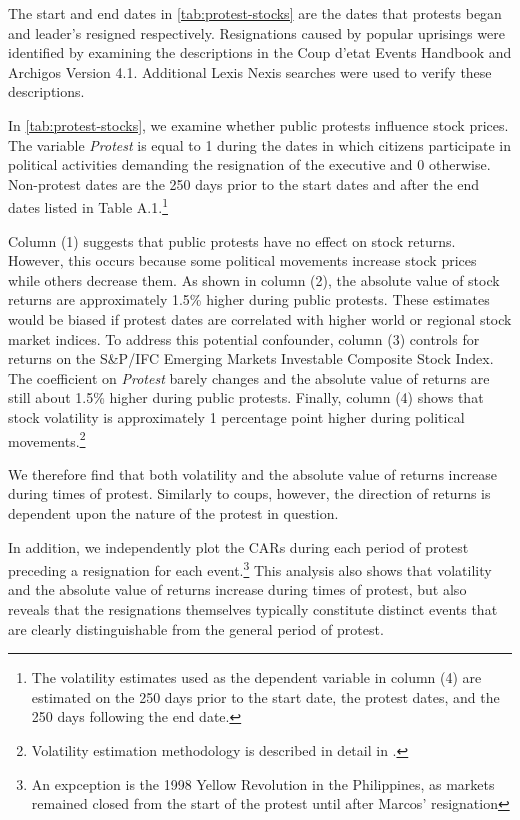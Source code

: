 \documentclass[12pt,final,fleqn]{article}
\theoremstyle{plain}
\begin{document}
The start and end dates in \autoref{tab:protest-stocks} are the dates that protests began and leader's resigned respectively. Resignations caused by popular uprisings were identified by examining the descriptions in the Coup d'etat Events Handbook and Archigos Version 4.1. Additional Lexis Nexis searches were used to verify these descriptions.

In \autoref{tab:protest-stocks}, we examine whether public protests influence stock prices. The variable \textit{Protest} is equal to 1 during the dates in which citizens participate in political activities demanding the resignation of the executive and 0 otherwise. Non-protest dates are the 250 days prior to the start dates and after the end dates listed in Table A.1.\footnote{The volatility estimates used as the dependent variable in column (4) are estimated on the 250 days prior to the start date, the protest dates, and the 250 days following the end date.}

Column (1) suggests that public protests have no effect on stock returns. However, this occurs because some political movements increase stock prices while others decrease them. As shown in column (2), the absolute value of stock returns are approximately 1.5\% higher during public protests. These estimates would be biased if protest dates are correlated with higher world or regional stock market indices. To address this potential confounder, column (3) controls for returns on the S\&P/IFC Emerging Markets Investable Composite Stock Index. The coefficient on \textit{Protest} barely changes and the absolute value of returns are still about 1.5\% higher during public protests. Finally, column (4) shows that stock volatility is approximately 1 percentage point higher during political movements.\footnote{Volatility estimation methodology is described in detail in .}

We therefore find that both volatility and the absolute value of returns increase during times of protest. Similarly to coups, however, the direction of returns is dependent upon the nature of the protest in question. 

In addition, we independently plot the CARs during each period of protest preceding a resignation for each event.\footnote{An expception is the 1998 Yellow Revolution in the Philippines, as markets remained closed from the start of the protest until after Marcos' resignation} This analysis also shows that volatility and the absolute value of returns increase during times of protest, but also reveals that the resignations themselves typically constitute distinct events that are clearly distinguishable from the general period of protest. 
\end{document}
